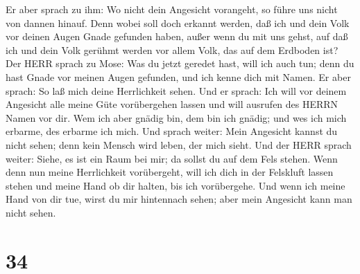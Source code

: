  Er aber sprach zu ihm: Wo nicht dein Angesicht vorangeht,
so führe uns nicht von dannen hinauf.  Denn wobei soll doch
erkannt werden, daß ich und dein Volk vor deinen Augen Gnade gefunden
haben, außer wenn du mit uns gehst, auf daß ich und dein Volk gerühmt
werden vor allem Volk, das auf dem Erdboden ist?  Der HERR
sprach zu Mose: Was du jetzt geredet hast, will ich auch tun; denn du
hast Gnade vor meinen Augen gefunden, und ich kenne dich mit Namen.
 Er aber sprach: So laß mich deine Herrlichkeit sehen.
 Und er sprach: Ich will vor deinem Angesicht alle meine
Güte vorübergehen lassen und will ausrufen des HERRN Namen vor dir. Wem
ich aber gnädig bin, dem bin ich gnädig; und wes ich mich erbarme, des
erbarme ich mich.  Und sprach weiter: Mein Angesicht kannst
du nicht sehen; denn kein Mensch wird leben, der mich sieht.
 Und der HERR sprach weiter: Siehe, es ist ein Raum bei
mir; da sollst du auf dem Fels stehen.  Wenn denn nun meine
Herrlichkeit vorübergeht, will ich dich in der Felskluft lassen stehen
und meine Hand ob dir halten, bis ich vorübergehe.  Und
wenn ich meine Hand von dir tue, wirst du mir hintennach sehen; aber
mein Angesicht kann man nicht sehen.

\hypertarget{section-33}{%
\section{34}\label{section-33}}

